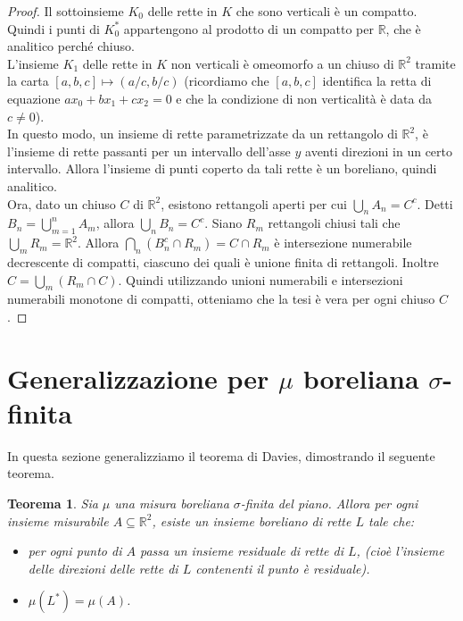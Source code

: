 \documentclass[a4paper, twoside]{article}
\newcommand{\R}{\mathbb{R}}
\newcommand{\<}{\langle}
\renewcommand{\>}{\rangle}
\newtheorem{teo}{Teorema}[]
\begin{document}
\begin{proof}
Il sottoinsieme $K_0$ delle rette in $K$ che sono verticali è un compatto. Quindi i punti di $K_0^*$ appartengono al prodotto di un compatto per $\R$, che è analitico perché chiuso.\\

L'insieme $K_1$ delle rette in $K$ non verticali è omeomorfo a un chiuso di $\R^2$ tramite la carta $[a,b,c] \mapsto (a/c,b/c)$ (ricordiamo che $[a,b,c]$ identifica la retta di equazione $ax_0+bx_1+cx_2=0$ e che la condizione di non verticalità è data da $c \neq 0$).\\
In questo modo, un insieme di rette parametrizzate da un rettangolo di $\R^2$, è l'insieme di rette passanti per un intervallo dell'asse $y$ aventi direzioni in un certo intervallo. Allora l'insieme di punti coperto da tali rette è un boreliano, quindi analitico.\\
Ora, dato un chiuso $C$ di $\R^2$, esistono rettangoli aperti per cui $\bigcup_n A_n = C^c$. Detti $B_n = \bigcup_{m=1}^n A_m$, allora $\bigcup_n B_n = C^c$. Siano $R_m$ rettangoli chiusi tali che $\bigcup_m R_m = \R^2$. Allora $\bigcap_n(B_n^c \cap R_m)=C \cap R_m$ è intersezione numerabile decrescente di compatti, ciascuno dei quali è unione finita di rettangoli. Inoltre $C=\bigcup_m(R_m \cap C)$. Quindi utilizzando unioni numerabili e intersezioni numerabili monotone di compatti, otteniamo che la tesi è vera per ogni chiuso $C$.
\end{proof}
\newpage


\section{Generalizzazione per $\mu$ boreliana $\sigma$-finita}

In questa sezione generalizziamo il teorema di Davies, dimostrando il seguente teorema.


\begin{teo} \label{teo1}
	Sia $\mu$ una misura boreliana $\sigma$-finita del piano. Allora per ogni insieme misurabile $A \subseteq \mathbb{R}^{2}$, esiste un insieme boreliano di rette $L$ tale che:
	\begin{itemize}
		\item per ogni punto di $A$ passa un insieme residuale di rette di $L$, (cioè l'insieme delle direzioni delle rette di $L$ contenenti il punto è residuale).
		\item $\mu\left(L^{*}\right)=\mu(A)$.
	\end{itemize}
\end{teo}
\end{document}
